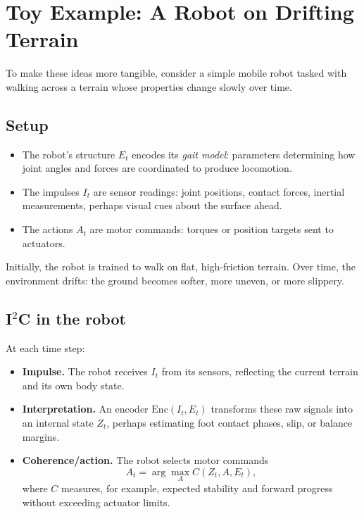 \documentclass[12pt,a4paper]{report}
\begin{document}
\section{Toy Example: A Robot on Drifting Terrain}

To make these ideas more tangible, consider a simple mobile robot tasked with walking across a terrain whose properties change slowly over time.

\subsection*{Setup}

\begin{itemize}[leftmargin=2em]
    \item The robot's structure \(E_t\) encodes its \emph{gait model}: parameters determining how joint angles and forces are coordinated to produce locomotion.
    \item The impulses \(I_t\) are sensor readings: joint positions, contact forces, inertial measurements, perhaps visual cues about the surface ahead.
    \item The actions \(A_t\) are motor commands: torques or position targets sent to actuators.
\end{itemize}

Initially, the robot is trained to walk on flat, high-friction terrain. Over time, the environment drifts: the ground becomes softer, more uneven, or more slippery.

\subsection*{I$^2$C in the robot}

At each time step:

\begin{itemize}[leftmargin=2em]
    \item \textbf{Impulse.} The robot receives \(I_t\) from its sensors, reflecting the current terrain and its own body state.
    \item \textbf{Interpretation.} An encoder \(\mathrm{Enc}(I_t, E_t)\) transforms these raw signals into an internal state \(Z_t\), perhaps estimating foot contact phases, slip, or balance margins.
    \item \textbf{Coherence/action.} The robot selects motor commands
    \[
        A_t = \arg\max_{A} C(Z_t, A, E_t),
    \]
    where \(C\) measures, for example, expected stability and forward progress without exceeding actuator limits.
\end{itemize}
\end{document}
